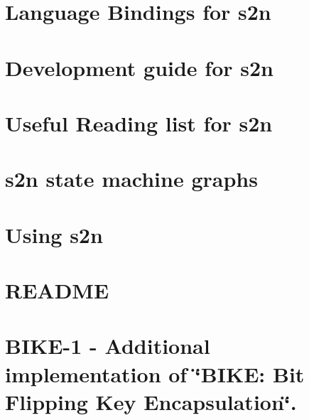 \documentclass[twoside]{book}
\newcommand{\+}{\discretionary{\mbox{\scriptsize$\hookleftarrow$}}{}{}}
\begin{document}
\chapter{Language Bindings for s2n}
\label{md_crt_aws_crt_cpp_crt_s2n_docs__b_i_n_d_i_n_g_s}

\chapter{Development guide for s2n}
\label{md_crt_aws_crt_cpp_crt_s2n_docs__d_e_v_e_l_o_p_m_e_n_t__g_u_i_d_e}

\chapter{Useful Reading list for s2n}
\label{md_crt_aws_crt_cpp_crt_s2n_docs__r_e_a_d_i_n_g__l_i_s_t}

\chapter{s2n state machine graphs}
\label{md_crt_aws_crt_cpp_crt_s2n_docs__s_t_a_t_e__m_a_c_h_i_n_e}

\chapter{Using s2n}
\label{md_crt_aws_crt_cpp_crt_s2n_docs__u_s_a_g_e__g_u_i_d_e}

\chapter{README}
\label{md_crt_aws_crt_cpp_crt_s2n_libcrypto_build__r_e_a_d_m_e}

\chapter{BIKE-\/1 -\/ Additional implementation of \char`\"{}\+BIKE\+: Bit Flipping Key Encapsulation\char`\"{}.}
\label{md_crt_aws_crt_cpp_crt_s2n_pq_crypto_bike_r1__r_e_a_d_m_e}

\end{document}
